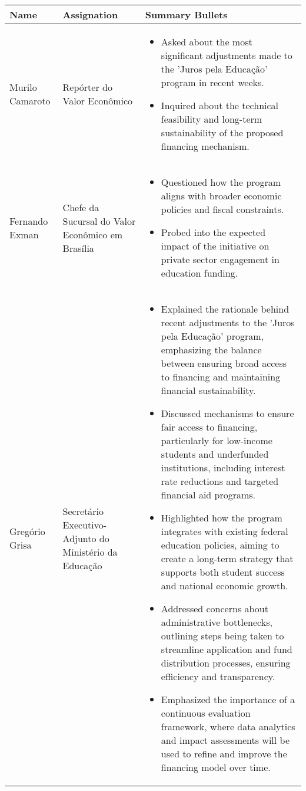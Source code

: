\documentclass[a4paper,10pt]{article}
\begin{document}
\begin{table}[htbp!]
	\centering
	\renewcommand{\arraystretch}{1.2}
	\begin{tabular}{|p{1in}|p{1.4in}|p{4.2in}|}
		\hline
		Name & Assignation & Summary Bullets \\
		\hline
		Murilo Camaroto & Repórter do Valor Econômico & \begin{itemize}
			\item Asked about the most significant adjustments made to the 'Juros pela Educação' program in recent weeks.
			\item Inquired about the technical feasibility and long-term sustainability of the proposed financing mechanism.
		\end{itemize}\\
		\hline
		Fernando Exman & Chefe da Sucursal do Valor Econômico em Brasília & \begin{itemize}
			\item Questioned how the program aligns with broader economic policies and fiscal constraints.
			\item Probed into the expected impact of the initiative on private sector engagement in education funding.
		\end{itemize}\\
		\hline
		Gregório Grisa & Secretário Executivo-Adjunto do Ministério da Educação & \begin{itemize}
			\item Explained the rationale behind recent adjustments to the 'Juros pela Educação' program, emphasizing the balance between ensuring broad access to financing and maintaining financial sustainability.
			\item Discussed mechanisms to ensure fair access to financing, particularly for low-income students and underfunded institutions, including interest rate reductions and targeted financial aid programs.
			\item Highlighted how the program integrates with existing federal education policies, aiming to create a long-term strategy that supports both student success and national economic growth.
			\item Addressed concerns about administrative bottlenecks, outlining steps being taken to streamline application and fund distribution processes, ensuring efficiency and transparency.
			\item Emphasized the importance of a continuous evaluation framework, where data analytics and impact assessments will be used to refine and improve the financing model over time.

\end{itemize}
\end{tabular}
\end{table}
\end{document}
